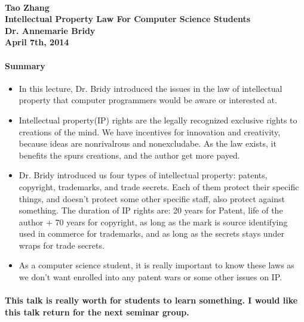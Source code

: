 \documentclass[12pt]{article}
\begin{document}
\paragraph{Tao Zhang\\Intellectual Property Law For Computer Science Students\\Dr. Annemarie Bridy\\April 7th, 2014}

\paragraph{Summary}

\begin{itemize}
\item In this lecture, Dr. Bridy introduced the issues in the law of intellectual property that computer programmers would be aware or interested at. 
\item Intellectual property(IP) rights are the legally recognized exclusive rights to creations of the mind. We have incentives for innovation and creativity, because ideas are nonrivalrous and nonexcludabe. As the law exists, it benefits the spurs creations, and the author get more payed.
\item Dr. Bridy introduced us four types of intellectual property: patents, copyright,  trademarks, and trade secrets. Each of them protect their specific things, and doesn't protect some other specific staff, also protect against something. The duration of IP rights are: 20 years for Patent, life of the author + 70 years for copyright, as long as the mark is source identifying used in commerce for trademarks, and as long as the secrets stays under wraps for trade secrets. 
\item As a computer science student, it is really important to know these laws as we don't want enrolled into any patent wars or some other issues on IP. 

\end{itemize}

\paragraph{This talk is really worth for students to learn something. I would like this talk return for the next seminar group.}
\end{document}

